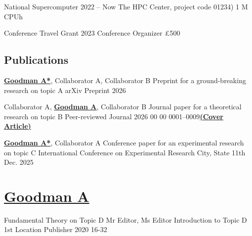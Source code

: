 \documentclass[a4paper,11pt]{article}
\newcommand{\MeAsAuthor}{\textbf{\underline{Goodman A}}}
\newcommand{\MeAsCorrespondingAuthor}{\textbf{\underline{Goodman A*}}}
\newcommand{\PaperComment}[1]{\textbf{\underline{(#1)}}}
\begin{document}
\grant
	{National Supercomputer}
	{2022 -- Now}
	{The HPC Center, project code 01234)}
	{1 M CPUh}{}

\grant
	{Conference Travel Grant}
	{2023}
	{Conference Organizer}
	{£500}{}


\section{Publications}


\begin{paperlist}[ascending=true]
	\preprint
		{\MeAsCorrespondingAuthor, Collaborator A, Collaborator B}
		{Preprint for a ground-breaking research on topic A}
		{arXiv}
		{Preprint}
		{2026}{}{}

	\journal
		{Collaborator A, \MeAsAuthor, Collaborator B}
		{Journal paper for a theoretical research on topic B}
		{Peer-reviewed Journal}
		{2026}
		{00}
		{00}
		{0001--0009}{}{\PaperComment{Cover Article}}

	\conference
		{\MeAsCorrespondingAuthor, Collaborator A}
		{Conference paper for an experimental research on topic C}
		{International Conference on Experimental Research}
		{City, State}
		{11th Dec. 2025}{}{}

	\chapter
		{\MeAsAuthor}
		{Fundamental Theory on Topic D}
		{Mr Editor, Ms Editor}
		{Introduction to Topic D}
		{1st}
		{Location}
		{Publisher}
		{2020}
		{16-32}{}{}

\end{paperlist}
\end{document}
